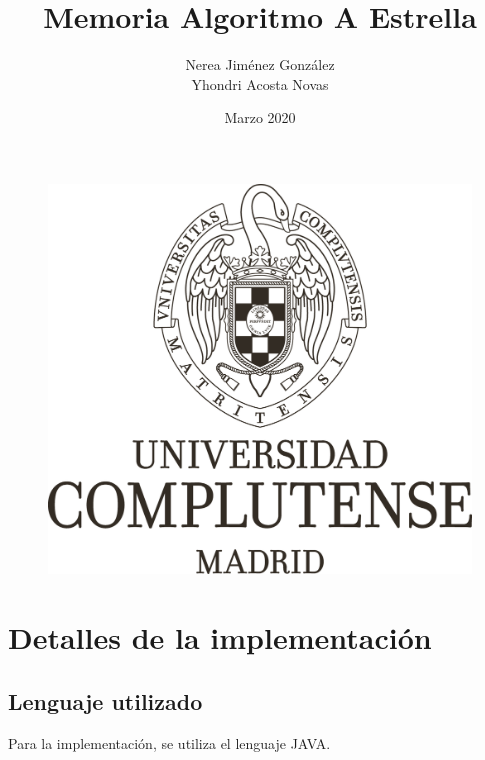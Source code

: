 \documentclass[12pt]{article}
\title{Memoria Algoritmo A Estrella}
\author{Nerea Jiménez González\\ Yhondri Acosta Novas}
\date{Marzo 2020}
\begin{document}
\maketitle
\begin{figure}[H]
    \centering
    \includegraphics[width=1\textwidth]{3-2016-07-21-Marca UCM Monocromo Negro.png}
\end{figure}

\newpage
\tableofcontents
\listoffigures
\newpage

\section{Detalles de la implementación}
\subsection{Lenguaje utilizado}
Para la implementación, se utiliza el lenguaje JAVA.
\end{document}

